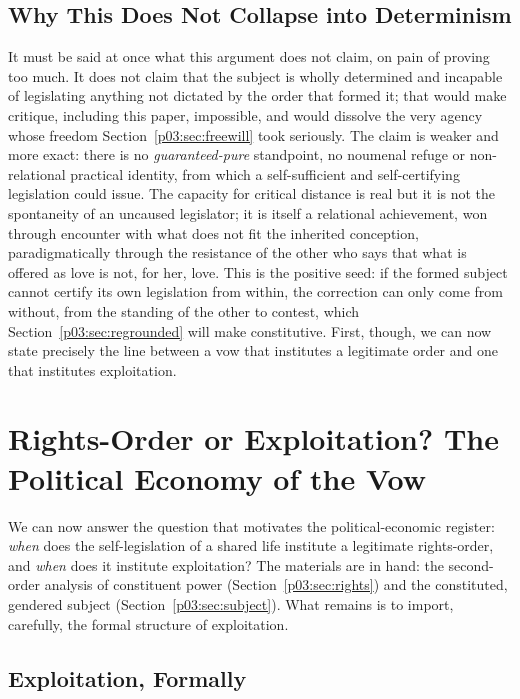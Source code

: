 \documentclass[11pt,a4paper]{article}
\begin{document}
\subsection{Why This Does Not Collapse into Determinism}

It must be said at once what this argument does not claim, on pain of proving too much. It does not claim that the subject is wholly determined and incapable of legislating anything not dictated by the order that formed it; that would make critique, including this paper, impossible, and would dissolve the very agency whose freedom Section~\ref{p03:sec:freewill} took seriously. The claim is weaker and more exact: there is no \emph{guaranteed-pure} standpoint, no noumenal refuge or non-relational practical identity, from which a self-sufficient and self-certifying legislation could issue. The capacity for critical distance is real but it is not the spontaneity of an uncaused legislator; it is itself a relational achievement, won through encounter with what does not fit the inherited conception, paradigmatically through the resistance of the other who says that what is offered as love is not, for her, love. This is the positive seed: if the formed subject cannot certify its own legislation from within, the correction can only come from without, from the standing of the other to contest, which Section~\ref{p03:sec:regrounded} will make constitutive. First, though, we can now state precisely the line between a vow that institutes a legitimate order and one that institutes exploitation.

\section{Rights-Order or Exploitation? The Political Economy of the Vow}\label{p03:sec:exploitation}

We can now answer the question that motivates the political-economic register: \emph{when} does the self-legislation of a shared life institute a legitimate rights-order, and \emph{when} does it institute exploitation? The materials are in hand: the second-order analysis of constituent power (Section~\ref{p03:sec:rights}) and the constituted, gendered subject (Section~\ref{p03:sec:subject}). What remains is to import, carefully, the formal structure of exploitation.

\subsection{Exploitation, Formally}
\end{document}
